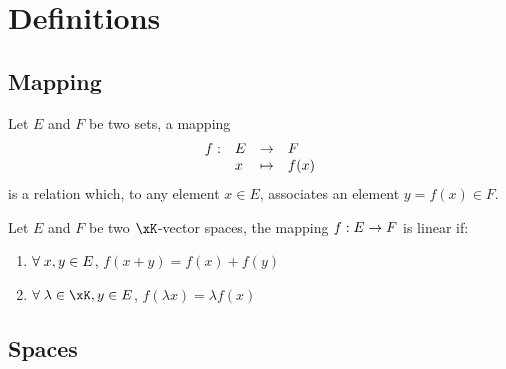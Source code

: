 
\chapter{Definitions}

\section{Mapping}

\begin{dfntn}[Mapping]\label{d:mapping}
Let $E$ and $F$ be two sets, a mapping
\begin{equation*}
\begin{array}{llll}
f:     & E & \rightarrow & F \\
\hfill & x & \mapsto     & f(x)
\end{array}
\end{equation*}
is a relation which, to any element $x \in E$, associates an element $y = f(x) \in F$.
\end{dfntn}

\medskip
\begin{dfntn}\label{d:linear_mapping}
Let $E$ and $F$ be two $\xK$-vector spaces, the mapping $f: E \rightarrow F$ is linear if:
\begin{enumerate}
\item ${\forall\;} x,y \in E$, $f(x + y) = f(x) + f(y)$
\item $\forany \lambda \in \xK, y \in E$, $f(\lambda x) = \lambda f(x)$
\end{enumerate}
\end{dfntn}

\section{Spaces}

